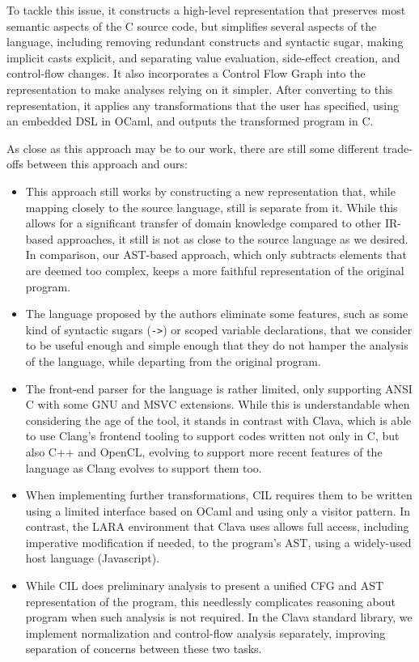 To tackle this issue, it constructs a high-level representation that preserves most semantic aspects of the C source code, but simplifies several aspects of the language, including removing redundant constructs and syntactic sugar, making implicit casts explicit, and separating value evaluation, side-effect creation, and control-flow changes. It also incorporates a Control Flow Graph into the representation to make analyses relying on it simpler. After converting to this representation, it applies any transformations that the user has specified, using an embedded DSL in OCaml, and outputs the transformed program in C.

As close as this approach may be to our work, there are still some different trade-offs between this approach and ours:

\begin{itemize}
    \item This approach still works by constructing a new representation that, while mapping closely to the source language, still is separate from it. While this allows for a significant transfer of domain knowledge compared to other IR-based approaches, it still is not as close to the source language as we desired. In comparison, our AST-based approach, which only subtracts elements that are deemed too complex, keeps a more faithful representation of the original program.
    \item The language proposed by the authors eliminate some features, such as some kind of syntactic sugars (\verb|->|) or scoped variable declarations, that we consider to be useful enough and simple enough that they do not hamper the analysis of the language, while departing from the original program.
    \item The front-end parser for the language is rather limited, only supporting ANSI C with some GNU and MSVC extensions. While this is understandable when considering the age of the tool, it stands in contrast with Clava, which is able to use Clang's frontend tooling to support codes written not only in C, but also C++ and OpenCL, evolving to support more recent features of the language as Clang evolves to support them too.
    \item When implementing further transformations, CIL requires them to be written using a limited interface based on OCaml and using only a visitor pattern. In contrast, the LARA environment that Clava uses allows full access, including imperative modification if needed, to the program's AST, using a widely-used host language (Javascript).
    \item While CIL does preliminary analysis to present a unified CFG and AST representation of the program, this needlessly complicates reasoning about program when such analysis is not required. In the Clava standard library, we implement normalization and control-flow analysis separately, improving separation of concerns between these two tasks.
\end{itemize}

